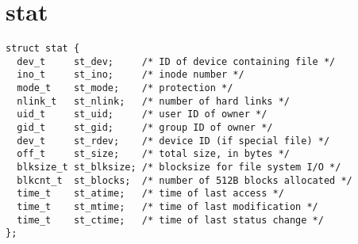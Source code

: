 \section{stat}
\begin{lstlisting}
struct stat {
  dev_t     st_dev;     /* ID of device containing file */
  ino_t     st_ino;     /* inode number */
  mode_t    st_mode;    /* protection */
  nlink_t   st_nlink;   /* number of hard links */
  uid_t     st_uid;     /* user ID of owner */
  gid_t     st_gid;     /* group ID of owner */
  dev_t     st_rdev;    /* device ID (if special file) */
  off_t     st_size;    /* total size, in bytes */
  blksize_t st_blksize; /* blocksize for file system I/O */
  blkcnt_t  st_blocks;  /* number of 512B blocks allocated */
  time_t    st_atime;   /* time of last access */
  time_t    st_mtime;   /* time of last modification */
  time_t    st_ctime;   /* time of last status change */
};
\end{lstlisting}
